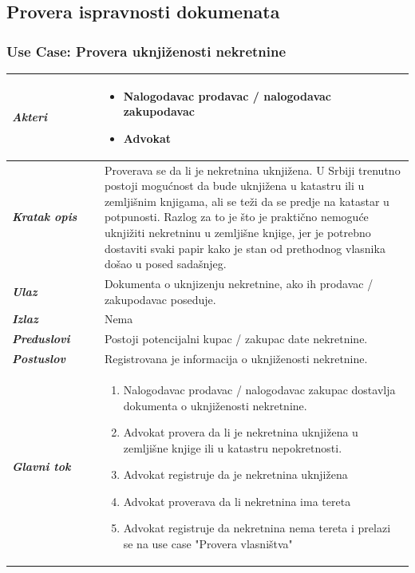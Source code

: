 \documentclass[20pt]{article}
\begin{document}
\subsection{\bfseries \Large Provera ispravnosti dokumenata}
\setlength{\parindent}{1cm}
\fontsize{13}{18} \selectfont 
\subsubsection{\bfseries \large Use Case: Provera uknji\v zenosti nekretnine}
\begin{center}
\begin{tabular}{p{0.23\linewidth} p{0.77\linewidth}}
 \hline
 {\it \bfseries Akteri} & \begin{itemize}
    \item Nalogodavac prodavac / nalogodavac zakupodavac
    \item Advokat
\end{itemize}\\
\hline

 {\it \bfseries Kratak opis} & Proverava se da li je nekretnina uknji\v zena. U Srbiji trenutno postoji mogu\' cnost da bude uknji\v zena u katastru ili u zemlji\v snim knjigama, ali se te\v zi da se predje na katastar u potpunosti. Razlog za to je \v sto je prakti\v cno nemogu\' ce uknji\v ziti nekretninu u zemlji\v sne knjige, jer je potrebno dostaviti svaki papir kako je stan od prethodnog vlasnika do\v sao u posed sada\v snjeg.\\ 
 \hline
 
 {\it \bfseries Ulaz} & Dokumenta o uknjizenju nekretnine, ako ih prodavac / zakupodavac poseduje.\\ 
 \hline
 
 {\it \bfseries Izlaz} & Nema\\
 \hline
 
 {\it \bfseries Preduslovi} & Postoji potencijalni kupac / zakupac date nekretnine.\\
 \hline

 {\it \bfseries Postuslov} & Registrovana je informacija o uknji\v zenosti nekretnine.\\
 \hline

     {\it \bfseries Glavni tok} &  
     \begin{enumerate}
        \item Nalogodavac prodavac / nalogodavac zakupac dostavlja dokumenta o uknji\v zenosti nekretnine.
        \item Advokat provera da li je nekretnina uknji\v zena u zemlji\v sne knjige ili u katastru nepokretnosti.
        \item Advokat registruje da je nekretnina uknji\v zena 
        \item Advokat proverava da li nekretnina ima tereta 
        \item Advokat registruje da nekretnina nema tereta i prelazi se na use case "Provera vlasni\v stva"
    \end{enumerate}\\
 \hline


\end{tabular}
\end{center}
\end{document}
